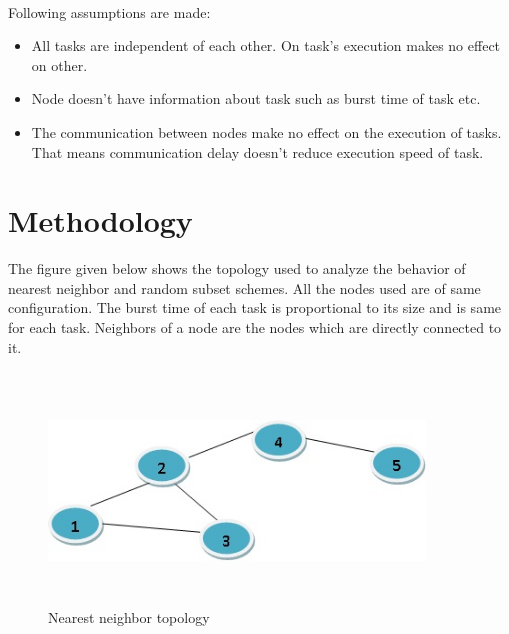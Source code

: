\documentclass[12pt]{article}
\begin{document}
\paragraph{}
Following assumptions are made:
\begin{itemize}

\item All tasks are independent of each other. On task’s execution makes no effect on other.
\item Node doesn’t have information about task such as burst time of task etc.
\item The communication between nodes make no effect on the execution of tasks. That means communication delay doesn’t reduce execution speed of task.

\end{itemize}

\section{Methodology}
The figure given below shows the topology used to analyze the behavior of nearest neighbor and random subset schemes. All the nodes used are of same configuration. The burst time of each task is proportional to its size and is same for each task. Neighbors of a node are the nodes which are directly connected to it.
\paragraph{}
\begin{figure}[h!]
  \centering
    \includegraphics[width=10cm, height=6cm]{fig_1.jpg}
    \centering
    \caption{Nearest neighbor topology }
\end{figure}
\end{document}
